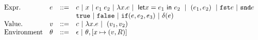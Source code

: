 
\[\begin{array}{llll}
\mbox{Expr.} & e & ::= & c ~|~ x ~|~ e_1 \; e_2 
 ~|~ \lambda x. e  ~|~ \mathrel{ \mathsf{let} {x} = {e_1} \ \mathsf{in} \ {e_2} } ~|~
                             \mathrel{ ( e_1 , e_2 ) } ~|~
                             \mathtt{fst}{e} ~|~ \mathtt{snd}{e}
    \\
             & & &  \mathtt{true} ~|~ \mathtt{false} ~|~
                   \mathtt{if} (e, e_2 , e_3) ~|~ \delta(e)   \\
    \mbox{Value.} & v & ::= & c ~|~   \lambda x. e  ~|~ \mathrel{ ( v_1 , v_2 ) }  \\
\mbox{Environment} & \theta & ::= & \epsilon ~|~ \theta, [ x \mapsto (v, R)]
\end{array}\]



